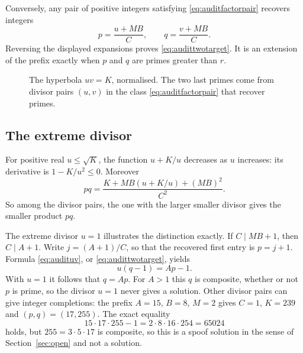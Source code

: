 Conversely, any pair of positive integers satisfying
\eqref{eq:auditfactorpair} recovers integers
\begin{equation}\label{eq:auditrecover}
 p=\frac{u+MB}{C},\qquad q=\frac{v+MB}{C}.
\end{equation}
Reversing the displayed expansions proves
\eqref{eq:audittwotarget}. It is an extension of the prefix exactly
when $p$ and $q$ are primes greater than $r$.

\begin{figure}[tbp]
\centering
{}
\caption{The hyperbola $uv=K$, normalised. The two last primes come
from divisor pairs $(u,v)$ in the class \eqref{eq:auditfactorpair}
that recover primes.}
\label{fig:audithyperbola}
\end{figure}

\subsection{The extreme divisor}
For positive real $u\le\sqrt K$, the function $u+K/u$ decreases as
$u$ increases: its derivative is $1-K/u^2\le0$. Moreover
\begin{equation}\label{eq:auditproduct}
 pq=\frac{K+MB(u+K/u)+(MB)^2}{C^2}.
\end{equation}
So among the divisor pairs, the one with the larger smaller divisor
gives the smaller product $pq$.

The extreme divisor $u=1$ illustrates the distinction exactly. If
$C\mid MB+1$, then $C\mid A+1$. Write $j=(A+1)/C$, so that the
recovered first entry is $p=j+1$. Formula \eqref{eq:audituv}, or
\eqref{eq:audittwotarget}, yields
\[
 u(q-1)=Ap-1.
\]
With $u=1$ it follows that $q=Ap$. For $A>1$ this $q$ is composite,
whether or not $p$ is prime, so the divisor $u=1$ never gives a
solution. Other divisor pairs can give integer completions: the prefix $A=15$, $B=8$, $M=2$
gives $C=1$, $K=239$ and $(p,q)=(17,255)$. The exact equality
\[
 15\cdot17\cdot255-1=2\cdot8\cdot16\cdot254=65024
\]
holds, but $255=3\cdot5\cdot17$ is composite, so this is a spoof
solution in the sense of Section~\ref{sec:open} and not a solution.

